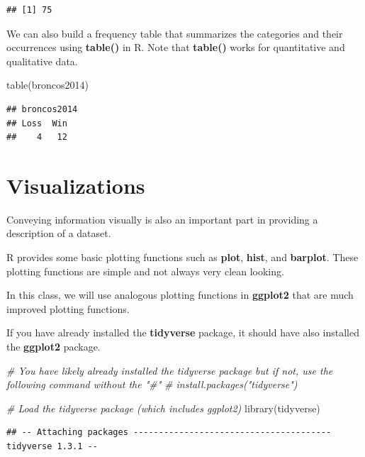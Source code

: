 \documentclass[
]{book}
\newenvironment{Shaded}{\begin{snugshade}}{\end{snugshade}}
\newcommand{\CommentTok}[1]{\textcolor[rgb]{0.56,0.35,0.01}{\textit{#1}}}
\newcommand{\FunctionTok}[1]{\textcolor[rgb]{0.00,0.00,0.00}{#1}}
\newcommand{\NormalTok}[1]{#1}
\theoremstyle{definition}
\theoremstyle{definition}
\theoremstyle{definition}
\theoremstyle{definition}
\theoremstyle{remark}
\begin{document}
\begin{verbatim}
## [1] 75
\end{verbatim}

We can also build a frequency table that summarizes the categories and their occurrences using \textbf{table()} in R. Note that \textbf{table()} works for quantitative and qualitative data.

\begin{Shaded}
\begin{Highlighting}[]
\FunctionTok{table}\NormalTok{(broncos2014)}
\end{Highlighting}
\end{Shaded}

\begin{verbatim}
## broncos2014
## Loss  Win 
##    4   12
\end{verbatim}

\hypertarget{visualizations}{%
\section{Visualizations}\label{visualizations}}

Conveying information visually is also an important part in providing a description of a dataset.

R provides some basic plotting functions such as \textbf{plot}, \textbf{hist}, and \textbf{barplot}. These plotting functions are simple and not always very clean looking.

In this class, we will use analogous plotting functions in \textbf{ggplot2} that are much improved plotting functions.

If you have already installed the \textbf{tidyverse} package, it should have also installed the \textbf{ggplot2} package.

\begin{Shaded}
\begin{Highlighting}[]
\CommentTok{\# You have likely already installed the tidyverse package but if not, use the following command without the "\#"}
\CommentTok{\# install.packages("tidyverse")}

\CommentTok{\# Load the tidyverse package (which includes ggplot2)}
\FunctionTok{library}\NormalTok{(tidyverse)}
\end{Highlighting}
\end{Shaded}

\begin{verbatim}
## -- Attaching packages --------------------------------------- tidyverse 1.3.1 --
\end{verbatim}
\end{document}
